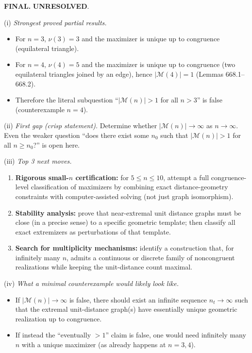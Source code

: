 \bigskip
\noindent\textbf{FINAL.} \textbf{UNRESOLVED}.

\smallskip
\noindent(i) \emph{Strongest proved partial results.}
\begin{itemize}
\item For $n=3$, $\nu(3)=3$ and the maximizer is unique up to congruence (equilateral triangle).
\item For $n=4$, $\nu(4)=5$ and the maximizer is unique up to congruence (two equilateral triangles joined by an edge), hence $|\mathcal{M}(4)|=1$ (Lemmas 668.1--668.2).
\item Therefore the literal subquestion ``$|\mathcal{M}(n)|>1$ for all $n>3$'' is false (counterexample $n=4$).
\end{itemize}

\noindent(ii) \emph{First gap (crisp statement).}
Determine whether $|\mathcal{M}(n)|\to\infty$ as $n\to\infty$.
Even the weaker question ``does there exist some $n_0$ such that $|\mathcal{M}(n)|>1$ for all $n\ge n_0$?'' is open here.

\noindent(iii) \emph{Top 3 next moves.}
\begin{enumerate}
\item \textbf{Rigorous small-$n$ certification:} for $5\le n\le 10$, attempt a full congruence-level classification of maximizers by combining exact distance-geometry constraints with computer-assisted solving (not just graph isomorphism).
\item \textbf{Stability analysis:} prove that near-extremal unit distance graphs must be close (in a precise sense) to a specific geometric template; then classify all exact extremizers as perturbations of that template.
\item \textbf{Search for multiplicity mechanisms:} identify a construction that, for infinitely many $n$, admits a continuous or discrete family of noncongruent realizations while keeping the unit-distance count maximal.
\end{enumerate}

\noindent(iv) \emph{What a minimal counterexample would likely look like.}
\begin{itemize}
\item If $|\mathcal{M}(n)|\to\infty$ is false, there should exist an infinite sequence $n_t\to\infty$ such that the extremal unit-distance graph(s) have essentially unique geometric realization up to congruence.
\item If instead the ``eventually $>1$'' claim is false, one would need infinitely many $n$ with a unique maximizer (as already happens at $n=3,4$).
\end{itemize}



